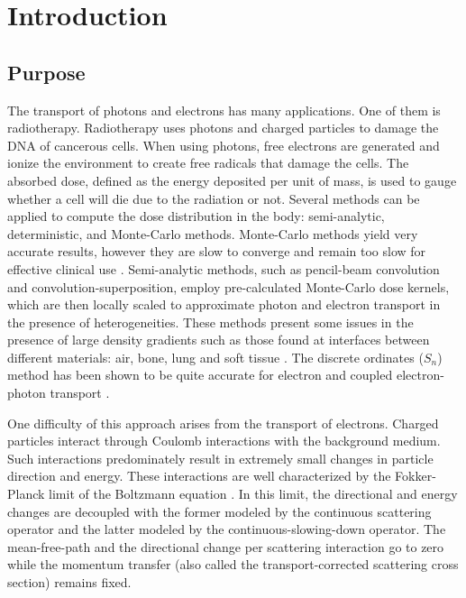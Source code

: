 \chapter{Introduction}
\section{Purpose}
The transport of photons and electrons has many applications. One of them is 
radiotherapy. Radiotherapy uses photons and charged particles to 
damage the DNA of cancerous cells. When using photons, free electrons are 
generated and ionize the environment to create free radicals that damage the cells. 
The absorbed dose, defined as the energy deposited per unit of mass, is used to 
gauge whether a cell will die due to the radiation or not. Several methods can be
applied to compute the dose distribution in the body: semi-analytic,
deterministic, and Monte-Carlo methods. Monte-Carlo methods yield very
accurate results, however they are slow to converge and remain too slow for
effective clinical use \cite{acuros,comet}. Semi-analytic methods, such as
pencil-beam convolution and convolution-superposition, employ pre-calculated
Monte-Carlo dose kernels, which are then locally scaled to approximate photon
and electron transport in the presence of heterogeneities. These methods
present some issues in the presence of large density gradients such as those
found at interfaces between different materials: air, bone, lung and soft
tissue \cite{acuros,seco,krieger}. The discrete ordinates ($S_n$) method has been 
shown to be quite accurate for electron and coupled electron-photon transport 
\cite{morel_81,accuracy_1,accuracy_2}.  

One difficulty of this approach arises from the transport of electrons. Charged 
particles interact through Coulomb interactions with the  background medium. 
Such interactions predominately result in extremely small changes 
in particle direction and energy. These interactions are well characterized by the
Fokker-Planck limit of the Boltzmann equation \cite{fp_limit,morel_96}. In this limit,
the directional and energy changes are decoupled with the former modeled by the
continuous scattering operator and the latter modeled by the continuous-slowing-down 
operator. The mean-free-path and the directional change per scattering interaction 
go to zero while the momentum transfer (also called the transport-corrected 
scattering cross section) remains fixed.

